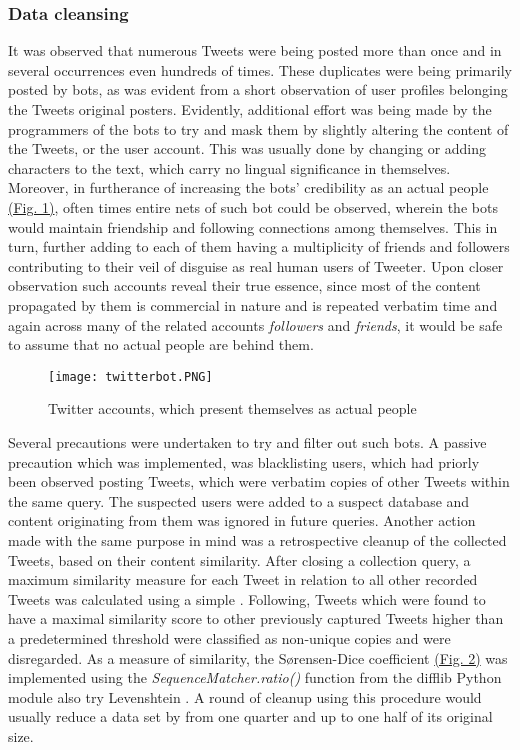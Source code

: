 		\subsubsection*{Data cleansing}
		It was observed that numerous Tweets were being posted more than once and in several occurrences even hundreds of times. These duplicates were being primarily posted by bots, as was evident from a short observation of user profiles belonging the Tweets original posters. Evidently, additional effort was being made by the programmers of the bots to try and mask them by slightly altering the content of the Tweets, or the user account. This was usually done by changing or adding characters to the text, which carry no lingual significance in themselves. Moreover, in furtherance of increasing the bots' credibility as an actual people \hyperref[fig:twitterbot]{(Fig. 1)}, often times entire nets of such bot could be observed, wherein the bots would maintain friendship and following connections among themselves. This in turn, further adding to each of them having a multiplicity of friends and followers contributing to their veil of disguise as real human users of Tweeter. Upon closer observation such accounts reveal their true essence, since most of the content propagated by them is commercial in nature and is repeated verbatim time and again across many of the related accounts \textit{followers} and \textit{friends}, it would be safe to assume that no actual people are behind them. 
		\par
		
		\begin{figure}[h]
			\centering
			\label{fig:twitterbot}
			\texttt{[image: twitterbot.PNG]}
			\caption{Twitter accounts, which present themselves as actual people}
		\end{figure}
		
		\newpage
		\noindent
		Several precautions were undertaken to try and filter out such bots. A passive precaution which was implemented, was blacklisting users, which had priorly been observed posting Tweets, which were verbatim copies of other Tweets within the same query. The suspected users were added to a suspect database and content originating from them was ignored in future queries. Another action made with the same purpose in mind was a retrospective cleanup of the collected Tweets, based on their content similarity. After closing a collection query, a maximum similarity measure for each Tweet in relation to all other recorded Tweets was calculated using a simple . Following, Tweets which were found to have a maximal similarity score to other previously captured Tweets  higher than a predetermined threshold were classified as non-unique copies and were disregarded. As a measure of similarity, the S\o rensen-Dice coefficient\cite{sorensen1948method} \hyperref[fig:sorenson_dice]{(Fig. 2)} was implemented using the \textit{SequenceMatcher.ratio()} function from the difflib Python module {\color{red} \Large also try Levenshtein }. A round of cleanup using this procedure would usually reduce a data set by from one quarter and up to one half of its original size.
		
